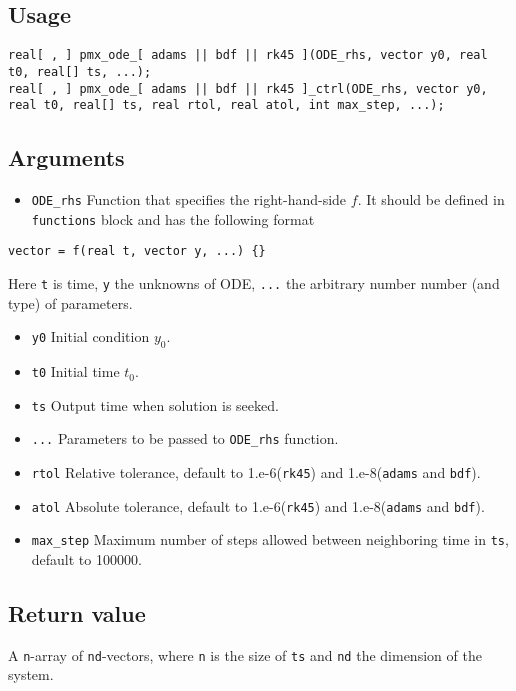 \documentclass[12pt, reqno, oneside]{amsbook}
\numberwithin{equation}{chapter}
\numberwithin{figure}{chapter}
\numberwithin{table}{chapter}
\theoremstyle{remark}
\begin{document}
\subsection{Usage}
\label{sec:org13cb90b}
\begin{verbatim}
real[ , ] pmx_ode_[ adams || bdf || rk45 ](ODE_rhs, vector y0, real t0, real[] ts, ...);
real[ , ] pmx_ode_[ adams || bdf || rk45 ]_ctrl(ODE_rhs, vector y0, real t0, real[] ts, real rtol, real atol, int max_step, ...);
\end{verbatim}
\subsection{Arguments}
\label{sec:orgcf984ad}
\begin{itemize}
\item \texttt{ODE\_rhs}
Function that specifies the right-hand-side \(f\).
It should be defined in
\texttt{functions} block and has the following format
\end{itemize}
\begin{verbatim}
vector = f(real t, vector y, ...) {}
\end{verbatim}
Here \texttt{t} is time, \texttt{y} the unknowns of ODE, \texttt{...} the arbitrary number number (and type) of parameters.
\begin{itemize}
\item \texttt{y0}
Initial condition \(y_0\).
\item \texttt{t0}
Initial time \(t_0\).
\item \texttt{ts}
Output time when solution is seeked.
\item \texttt{...}
Parameters to be passed to \texttt{ODE\_rhs} function.
\item \texttt{rtol}
Relative tolerance, default to 1.e-6(\texttt{rk45}) and 1.e-8(\texttt{adams} and \texttt{bdf}).
\item \texttt{atol}
Absolute tolerance, default to 1.e-6(\texttt{rk45}) and 1.e-8(\texttt{adams} and \texttt{bdf}).
\item \texttt{max\_step}
Maximum number of steps allowed between neighboring time in \texttt{ts},
default to 100000.
\end{itemize}
\subsection{Return value}
\label{sec:org0bffd09}
A \texttt{n}-array of \texttt{nd}-vectors, where \texttt{n} is the size of \texttt{ts}
and \texttt{nd} the dimension of the system.
\end{document}
